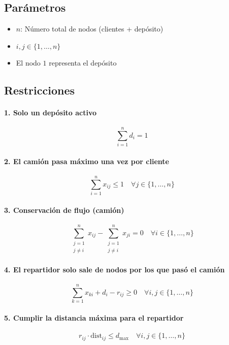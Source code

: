 \documentclass{article}
\begin{document}
\subsection*{Parámetros}
\begin{itemize}
    \item \( n \): Número total de nodos (clientes + depósito)
    \item \( i, j \in \{1, \dots, n\} \)
    \item El nodo \(1\) representa el depósito
\end{itemize}

\subsection*{Restricciones}

\paragraph{1. Solo un depósito activo}
\[
\sum_{i=1}^{n} d_i = 1
\]

\paragraph{2. El camión pasa máximo una vez por cliente}
\[
\sum_{i=1}^{n} x_{ij} \leq 1 \quad \forall j \in \{1, \dots, n\}
\]

\paragraph{3. Conservación de flujo (camión)}
\[
\sum_{\substack{j=1 \\ j \ne i}}^{n} x_{ij} - \sum_{\substack{j=1 \\ j \ne i}}^{n} x_{ji} = 0 \quad \forall i \in \{1, \dots, n\}
\]

\paragraph{4. El repartidor solo sale de nodos por los que pasó el camión}
\[
\sum_{k=1}^{n} x_{ki} + d_i - r_{ij} \geq 0 \quad \forall i,j \in \{1, \dots, n\}
\]

\paragraph{5. Cumplir la distancia máxima para el repartidor}
\[
r_{ij} \cdot \text{dist}_{ij} \leq d_{\text{max}} \quad \forall i,j \in \{1, \dots, n\}
\]
\end{document}
